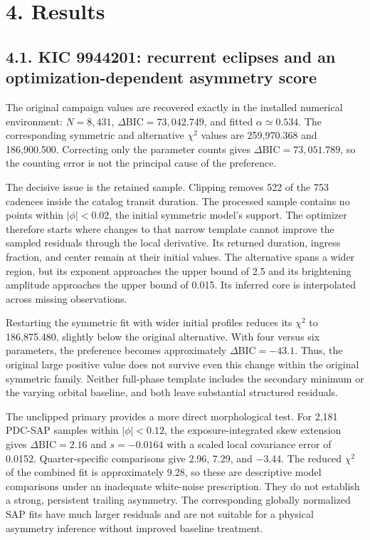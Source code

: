 \documentclass[
  english,
]{article}
\begin{document}
\section{4. Results}\label{results}

\subsection{4.1. KIC 9944201: recurrent eclipses and an
optimization-dependent asymmetry
score}\label{kic-9944201-recurrent-eclipses-and-an-optimization-dependent-asymmetry-score}

The original campaign values are recovered exactly in the installed
numerical environment: \(N=8{,}431\),
\(\Delta\mathrm{BIC}=73{,}042.749\), and fitted \(\alpha\simeq0.534\).
The corresponding symmetric and alternative \(\chi^2\) values are
259,970.368 and 186,900.500. Correcting only the parameter counts gives
\(\Delta\mathrm{BIC}=73{,}051.789\), so the counting error is not the
principal cause of the preference.

The decisive issue is the retained sample. Clipping removes 522 of the
753 cadences inside the catalog transit duration. The processed sample
contains no points within \(|\phi|<0.02\), the initial symmetric model's
support. The optimizer therefore starts where changes to that narrow
template cannot improve the sampled residuals through the local
derivative. Its returned duration, ingress fraction, and center remain
at their initial values. The alternative spans a wider region, but its
exponent approaches the upper bound of 2.5 and its brightening amplitude
approaches the upper bound of 0.015. Its inferred core is interpolated
across missing observations.

Restarting the symmetric fit with wider initial profiles reduces its
\(\chi^2\) to 186,875.480, slightly below the original alternative. With
four versus six parameters, the preference becomes approximately
\(\Delta\mathrm{BIC}=-43.1\). Thus, the original large positive value
does not survive even this change within the original symmetric family.
Neither full-phase template includes the secondary minimum or the
varying orbital baseline, and both leave substantial structured
residuals.

The unclipped primary provides a more direct morphological test. For
2,181 PDC-SAP samples within \(|\phi|<0.12\), the exposure-integrated
skew extension gives \(\Delta\mathrm{BIC}=2.16\) and \(s=-0.0164\) with
a scaled local covariance error of 0.0152. Quarter-specific comparisons
give 2.96, 7.29, and −3.44. The reduced \(\chi^2\) of the combined fit
is approximately 9.28, so these are descriptive model comparisons under
an inadequate white-noise prescription. They do not establish a strong,
persistent trailing asymmetry. The corresponding globally normalized SAP
fits have much larger residuals and are not suitable for a physical
asymmetry inference without improved baseline treatment.
\end{document}
